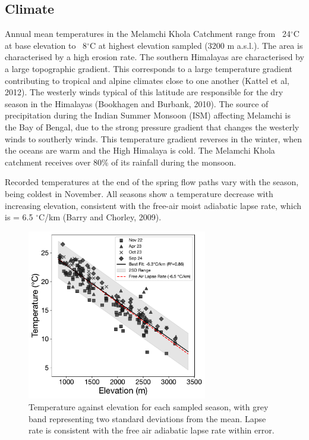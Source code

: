 \subsection{Climate}

Annual mean temperatures in the Melamchi Khola Catchment range from ~24$^{\circ}$C at base elevation to ~8$^{\circ}$C at highest elevation sampled (3200 m a.s.l.). The area is characterised by a high erosion rate.  The southern Himalayas are characterised by a large topographic gradient. This corresponds to a large temperature gradient contributing to tropical and alpine climates close to one another (Kattel et al, 2012). The westerly winds typical of this latitude are responsible for the dry season in the Himalayas (Bookhagen and Burbank, 2010). The source of precipitation during the Indian Summer Monsoon (ISM) affecting Melamchi is the Bay of Bengal, due to the strong pressure gradient that changes the westerly winds to southerly winds. This temperature gradient reverses in the winter, when the oceans are warm and the High Himalaya is cold.  The Melamchi Khola catchment receives over 80\% of its rainfall during the monsoon.

\bsk

Recorded temperatures at the end of the spring flow paths vary with the season, being coldest in November. All seasons show a temperature decrease with increasing elevation, consistent with the free-air moist adiabatic lapse rate, which is = 6.5 $^{\circ}$C/km (Barry and Chorley, 2009).

\begin{figure}[h]
    \centering
    \includegraphics[width=0.7\textwidth]{Temperature_Elevation_Season.pdf}
    \caption{Temperature against elevation for each sampled season, with grey band representing two standard deviations from the mean. Lapse rate is consistent with the free air adiabatic lapse rate within error.}
    \label{fig:temperature}
\end{figure}

